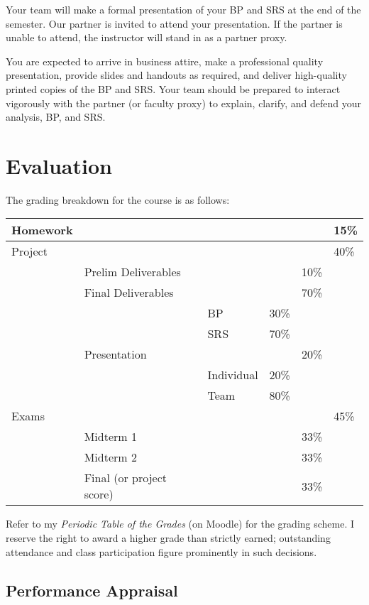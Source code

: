\documentclass[11pt]{article}
\begin{document}
Your team will make a formal presentation of your BP and SRS at the end
of the semester. Our partner is invited to attend your presentation. If the partner is
unable to attend, the instructor will stand in as a partner proxy.

You are expected to arrive in business attire, make a professional quality presentation,
provide slides and handouts as required, and deliver high-quality printed copies of the
BP and SRS.
Your team should be prepared to interact vigorously with the partner (or faculty proxy)
to explain, clarify, and defend your analysis, BP, and SRS.

\section{Evaluation}

The grading breakdown for the course is as follows:
\begin{center}
  \begin{tabular}{llllll}
    \hline
    Homework &  &  &  &  & 15\%\\
    \hline
    Project &  &  &  &  & 40\%\\
             & Prelim Deliverables &  &  & 10\% & \\
             & Final Deliverables &  &  & 70\% & \\
             &  & BP & 30\% &  & \\
             &  & SRS & 70\% &  & \\
             & Presentation &  &  & 20\% & \\
             &  & Individual & 20\% &  & \\
             &  & Team & 80\% &  & \\
    \hline
    Exams &  &  &  &  & 45\%\\
             & Midterm 1 &  &  & 33\% & \\
             & Midterm 2 &  &  & 33\% & \\
             & Final (or project score) &  &  & 33\% & \\
    \hline
  \end{tabular}
\end{center}
Refer to my \emph{Periodic Table of the Grades} (on Moodle) for the grading scheme. I reserve
the right to award a higher grade than strictly earned; outstanding attendance and class
participation figure prominently in such decisions.

\subsection{Performance Appraisal}
\end{document}
